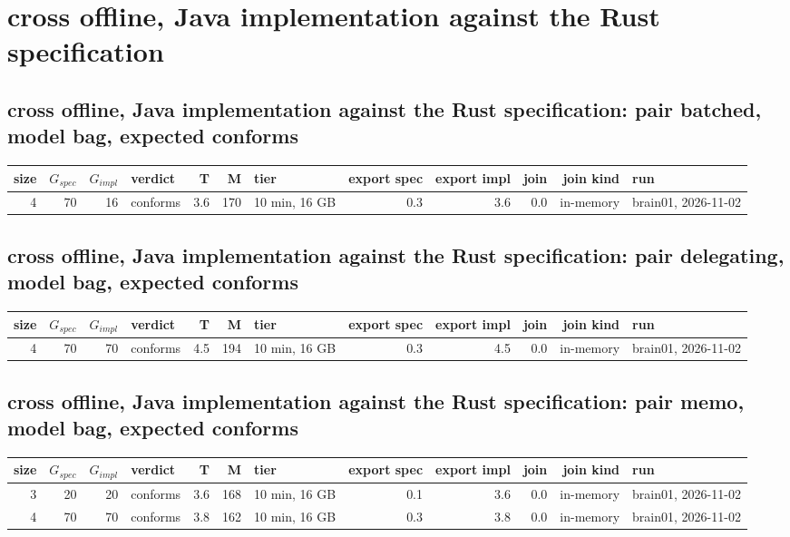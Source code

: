 \documentclass[10pt]{article}
\begin{document}
\section*{cross offline, Java implementation against the Rust specification}
\subsection*{cross offline, Java implementation against the Rust specification: pair \textsf{batched}, model bag, expected conforms}
\begin{longtable}{@{}rrrlrrlrrrrl@{}}
\toprule
size & $G_{\mathit{spec}}$ & $G_{\mathit{impl}}$ & verdict & T & M & tier & export spec & export impl & join & join kind & run \\
\midrule
\endhead
\color{red} 4 & 70 & 16 & conforms & 3.6 & 170 & 10 min, 16 GB & 0.3 & 3.6 & 0.0 & in-memory & brain01, 2026-11-02 \\
\bottomrule
\end{longtable}
\subsection*{cross offline, Java implementation against the Rust specification: pair \textsf{delegating}, model bag, expected conforms}
\begin{longtable}{@{}rrrlrrlrrrrl@{}}
\toprule
size & $G_{\mathit{spec}}$ & $G_{\mathit{impl}}$ & verdict & T & M & tier & export spec & export impl & join & join kind & run \\
\midrule
\endhead
\color{red} 4 & 70 & 70 & conforms & 4.5 & 194 & 10 min, 16 GB & 0.3 & 4.5 & 0.0 & in-memory & brain01, 2026-11-02 \\
\bottomrule
\end{longtable}
\subsection*{cross offline, Java implementation against the Rust specification: pair \textsf{memo}, model bag, expected conforms}
\begin{longtable}{@{}rrrlrrlrrrrl@{}}
\toprule
size & $G_{\mathit{spec}}$ & $G_{\mathit{impl}}$ & verdict & T & M & tier & export spec & export impl & join & join kind & run \\
\midrule
\endhead
\color{red} 3 & 20 & 20 & conforms & 3.6 & 168 & 10 min, 16 GB & 0.1 & 3.6 & 0.0 & in-memory & brain01, 2026-11-02 \\
\color{red} 4 & 70 & 70 & conforms & 3.8 & 162 & 10 min, 16 GB & 0.3 & 3.8 & 0.0 & in-memory & brain01, 2026-11-02 \\
\bottomrule
\end{longtable}
\end{document}
